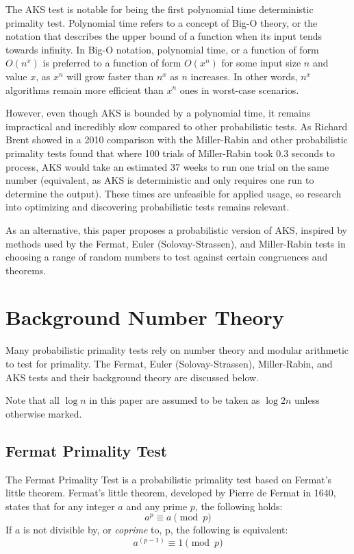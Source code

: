 \documentclass{article}
\begin{document}
The AKS test is notable for being the first polynomial time deterministic primality test. Polynomial time refers to a concept of Big-O theory, or the notation that describes the upper bound of a function when its input tends towards infinity. In Big-O notation, polynomial time, or a function of form $O(n^x)$ is preferred to a function of form $O(x^n)$ for some input size $n$ and value $x$, as $x^n$ will grow faster than $n^x$ as $n$ increases. In other words, $n^x$ algorithms remain more efficient than $x^n$ ones in worst-case scenarios. 

However, even though AKS is bounded by a polynomial time, it remains impractical and incredibly slow compared to other probabilistic tests. As Richard Brent showed in a 2010 comparison with the Miller-Rabin and other probabilistic primality tests found that where 100 trials of Miller-Rabin took 0.3 seconds to process, AKS would take an estimated 37 weeks to run one trial on the same number (equivalent, as AKS is deterministic and only requires one run to determine the output). These times are unfeasible for applied usage, so research into optimizing and discovering probabilistic tests remains relevant.

As an alternative, this paper proposes a probabilistic version of AKS, inspired by methods used by the Fermat, Euler (Solovay-Strassen), and Miller-Rabin tests in choosing a range of random numbers to test against certain congruences and theorems.

\section{Background Number Theory}

Many probabilistic primality tests rely on number theory and modular arithmetic to test for primality. The Fermat, Euler (Solovay-Strassen), Miller-Rabin, and AKS tests and their background theory are discussed below.

Note that all $\log{n}$ in this paper are assumed to be taken as $\log{2}{n}$ unless otherwise marked.

\subsection{Fermat Primality Test}
The Fermat Primality Test is a probabilistic primality test based on Fermat's little theorem.
Fermat's little theorem, developed by Pierre de Fermat in 1640, states that for any integer $a$ and any prime $p$, the following holds:
\[
    a^p \equiv a \pmod{p} 
\]
If $a$ is not divisible by, or \emph{coprime} to, p, the following is equivalent:
\[
    a^{(p - 1)} \equiv 1 \pmod{p} 
\]
\end{document}
